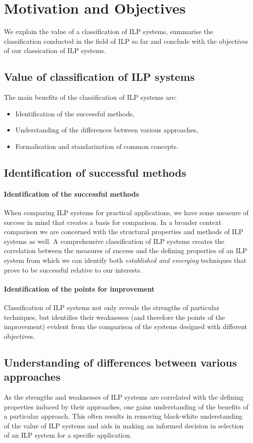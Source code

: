 \section{Motivation and Objectives}
We explain the value of a classification of ILP systems, summarise the classification conducted in the field of ILP so far and conclude with the objectives of our classication of ILP systems.

\subsection{Value of classification of ILP systems}
The main benefits of the classification of ILP systems are:
\begin{itemize}
\item Identification of the successful methods,
\item Understanding of the differences between various approaches,
\item Formalisation and standarization of common concepts.
\end{itemize}

\subsection{Identification of successful methods}
\paragraph{Identification of the successful methods}
When comparing ILP systems for practical applications, we have some measure of success in mind that creates a basis for comparison. In a broader context comparison we are concerned with the structural properties and methods of ILP systems as well.
A comprehensive classification of ILP systems creates the correlation between the measures of success and the defining properties of an ILP system from which we can identify both \emph{established and emerging} techniques that prove to be successful relative to our interests.
\paragraph{Identification of the points for improvement}
Classification of ILP systems not only reveals the strengths of particular techniques, but identifies their weaknesses (and therefore the points of the improvement) evident from the comparison of the systems designed with different objectives.
\subsection{Understanding of differences between various approaches}
As the strengths and weaknesses of ILP systems are correlated with the defining properties induced by their approaches, one gains understanding of the benefits of a particular approach. This often results in removing black-white understanding of the value of ILP systems and aids in making an informed decision in selection of an ILP system for a specific application.

